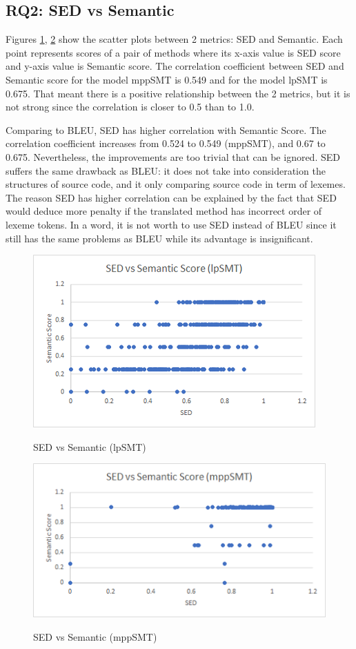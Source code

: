 \subsection{RQ2: SED vs Semantic}
Figures \ref{fig:SedSemlpSMT}, \ref{fig:SedSemMppSMT}  show the scatter plots between 2 metrics: SED and Semantic. Each point represents scores of a pair of methods where its x-axis value is SED score and y-axis value is Semantic score.
The correlation coefficient between SED and Semantic score for the model mppSMT is 0.549 and for the model lpSMT is 0.675. That meant there is a positive relationship between the 2 metrics, but it is not strong since the correlation is closer to 0.5 than to 1.0.

Comparing to BLEU, SED has higher correlation with Semantic Score. The correlation coefficient increases from 0.524 to 0.549 (mppSMT), and 0.67 to 0.675. Nevertheless, the improvements are too trivial that can be ignored. SED suffers the same drawback as BLEU: it does not take into consideration the structures of source code, and it only comparing source code in term of lexemes. The reason SED has higher correlation can be explained by the fact that SED would deduce more penalty if the translated method has incorrect order of lexeme tokens. In a word, it is not worth to use SED instead of BLEU since it still has the same problems as BLEU while its advantage is insignificant. 

\begin{figure}
\caption{SED vs Semantic (lpSMT)}
\centering
\includegraphics{img/sedvssem_lpSMT.png}
\label{fig:SedSemlpSMT}
\end{figure}

\begin{figure}
\caption{SED vs Semantic (mppSMT)}
\centering
\includegraphics{img/sedvssem_mppSMT.png}
\label{fig:SedSemMppSMT}
\end{figure}


